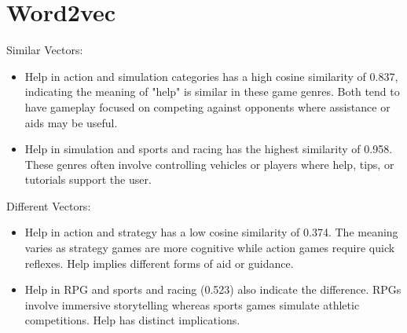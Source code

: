 \DeclareRobustCommand{\mybox}[2][gray!20]{%
\begin{tcolorbox}[   %
        breakable,
        left=0pt,
        right=0pt,
        top=0pt,
        bottom=0pt,
        colback=#1,
        colframe=#1,
        width=\dimexpr\textwidth\relax, 
        enlarge left by=0mm,
        boxsep=5pt,
        arc=0pt,outer arc=0pt,
        ]
        #2
\end{tcolorbox}
}

\section{Word2vec}

\begin{center}
\end{center}


Similar Vectors:

\begin{itemize}
\item Help in action and simulation categories has a high cosine similarity of 0.837, indicating the meaning of "help" is similar in these game genres. Both tend to have gameplay focused on competing against opponents where assistance or aids may be useful.

\item Help in simulation and sports and racing has the highest similarity of 0.958. These genres often involve controlling vehicles or players where help, tips, or tutorials support the user. 

\end{itemize}


\newpage

Different Vectors: 

\begin{itemize}
\item Help in action and strategy has a low cosine similarity of 0.374. The meaning varies as strategy games are more cognitive while action games require quick reflexes. Help implies different forms of aid or guidance.

\item Help in RPG and sports and racing (0.523) also indicate the difference. RPGs involve immersive storytelling whereas sports games simulate athletic competitions. Help has distinct implications.

\end{itemize}

